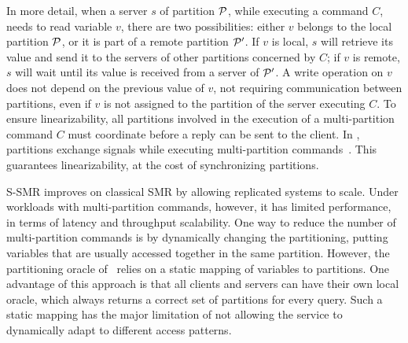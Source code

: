 %


In more detail, when a server $s$ of partition $\mathcal{P}$, while executing a command $C$, needs to read variable $v$, there are two possibilities:
either $v$ belongs to the local partition $\mathcal{P}$,
or it is part of a remote partition $\mathcal{P}'$. 
If $v$ is local, $s$ will retrieve its value and send it to the servers of other partitions concerned by $C$;
if $v$ is remote, $s$ will wait until its value is received from a server of $\mathcal{P}'$. 
A write operation on $v$ does not depend on the previous value of $v$, not requiring communication between partitions, even if $v$ is not assigned to the partition of the server executing $C$.
To ensure linearizability, all partitions involved in the execution of a multi-partition command $C$ must coordinate before a reply can be sent to the client.
In \ssmr{}, partitions exchange signals while executing multi-partition commands~\cite{bezerra2014ssmr}.
This guarantees linearizability, at the cost of synchronizing partitions.

S-SMR improves on classical SMR by allowing replicated systems to scale. 
Under workloads with multi-partition commands, however, it has limited performance, in terms of latency and throughput scalability. 
%
One way to reduce the number of multi-partition commands is by dynamically changing the partitioning, putting variables that are usually accessed together in the same partition.
However, the partitioning oracle of \ssmr\ relies on a static mapping of variables to partitions.
One advantage of this approach is that all clients and servers can have their own local oracle, which always returns a correct set of partitions for every query.
Such a static mapping has the major limitation of not allowing the service to dynamically adapt to different access patterns.

